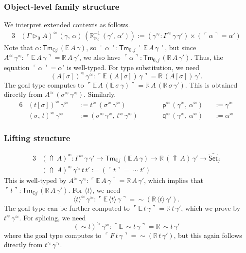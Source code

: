\documentclass[acmsmall,review]{acmart}
\newcommand{\msf}[1]{\mathsf{#1}}
\newcommand{\mbb}[1]{\mathbb{#1}}
\newcommand{\wh}[1]{\widehat{#1}}
\newcommand{\ext}{\triangleright}
\newcommand{\Lift}{{\Uparrow}}
\newcommand{\spl}{{\sim}}
\newcommand{\qut}[1]{\langle #1\rangle}
\newcommand{\mbbo}{\mbb{O}}
\newcommand{\Tm}{\msf{Tm}}
\newcommand{\p}{\mathsf{p}}
\newcommand{\q}{\mathsf{q}}
\newcommand{\Set}{\mathsf{Set}}
\newcommand{\emb}[1]{\ulcorner#1\urcorner}
\newcommand{\ev}{\mbb{E}}
\newcommand{\re}{\mbb{R}}
\theoremstyle{remark}
\newcommand{\whset}{\wh{\Set}}
\newcommand{\rextizero}{\re_{\ext_0}^{-1}}
\newcommand{\rel}{^{\approx}}
\begin{document}
\subsubsection{Object-level family structure} We interpret extended contexts as follows.
\begin{alignat*}{3}
  & (\Gamma \ext_0 A)\rel\,(\gamma,\,\alpha)\,(\rextizero\,(\gamma',\,\alpha')) := (\gamma\rel : \Gamma\rel\,\gamma\,\gamma') \times (\emb{\alpha} = \alpha')
\end{alignat*}
Note that $\alpha : \Tm_{\mbbo j}\,(\ev\,A\,\gamma)$, so $\emb{\alpha} :
\Tm_{0,j}\,\emb{\ev\,A\,\gamma}$, but since $A\rel\,\gamma\rel :
\emb{\ev\,A\,\gamma} = \re\,A\,\gamma'$, we also have $\emb{\alpha} :
\Tm_{0,j}\,(\re\,A\,\gamma')$. Thus, the equation $\emb{\alpha} = \alpha'$ is
well-typed. For type substitution, we need
\[
  (A[\sigma])\rel\,\gamma\rel : \emb{\ev\,(A[\sigma])\,\gamma} = \re\,(A[\sigma])\,\gamma'.
\]
The goal type computes to $\emb{\ev\,A\,(\ev\,\sigma\,\gamma)} =
\re\,A\,(\re\,\sigma\,\gamma')$. This is obtained directly from
$A\rel\,(\sigma\rel\,\gamma\rel)$.  Similarly,
\begin{alignat*}{6}
  & (t[\sigma])\rel\,\gamma\rel &&:= t\rel\,(\sigma\rel\,\gamma\rel) && \p\rel\,(\gamma\rel,\,\alpha\rel) &&:= \gamma\rel \\
  & (\sigma,\,t)\rel\,\gamma\rel &&:= (\sigma\rel\,\gamma\rel,\,t\rel\,\gamma\rel)\hspace{2em}&& \q\rel\,(\gamma\rel,\,\alpha\rel) &&:= \alpha\rel
\end{alignat*}

\subsubsection{Lifting structure}
\begin{alignat*}{3}
  &(\Lift\,A)\rel : \Gamma\rel\,\gamma\,\gamma' \to \Tm_{\mbbo j}\,(\ev\,A\,\gamma) \to \re\,(\Lift\,A)\,\gamma' \to \whset_j\\
  &(\Lift\,A)\rel\,\gamma\rel\,t\,t' := (\emb{t} = \spl t')
\end{alignat*}
This is well-typed by $A\rel\,\gamma\rel : \emb{\ev\,A\,\gamma} = \re\,A\,\gamma'$, which implies
that $\emb{t} : \Tm_{\mbbo j}\,(\re\,A\,\gamma')$. For $\qut{t}$, we need
\[  \qut{t}\rel\,\gamma\rel : \emb{\ev\,\qut{t}\,\gamma} = \spl(\re\,\qut{t}\,\gamma'). \]
The goal type can be further computed to $\emb{\ev\,t\,\gamma} = \re\,t\,\gamma'$, which we prove
by $t\rel\,\gamma\rel$. For splicing, we need
\[
  (\spl t)\rel\,\gamma\rel : \emb{\ev\,\spl t\,\gamma} = \re\,\spl t\,\gamma'
\]
where the goal type computes to $\emb{F\,t\,\gamma} = \spl(\re\,t\,\gamma')$,
but this again follows directly from $t\rel\,\gamma\rel$.
\end{document}
